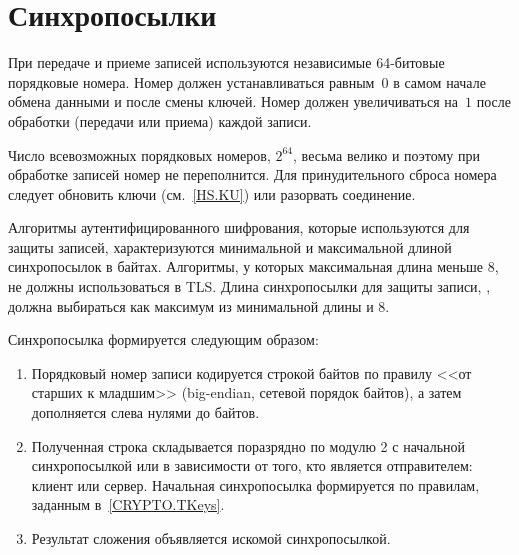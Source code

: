 \section{Синхропосылки}\label{RECORD.Nonce}

При передаче и приеме записей используются независимые 64-битовые порядковые номера.
Номер должен устанавливаться равным~$0$ в самом начале обмена данными и после 
смены ключей. Номер должен увеличиваться на~$1$ после обработки (передачи 
или приема) каждой записи. 

Число всевозможных порядковых номеров, $2^{64}$, весьма велико и поэтому при 
обработке записей номер не переполнится. Для принудительного сброса 
номера следует обновить ключи (см.~\ref{HS.KU}) или разорвать соединение.

Алгоритмы аутентифицированного шифрования, которые используются для защиты 
записей, характеризуются минимальной и максимальной длиной синхропосылок в байтах.
Алгоритмы, у которых максимальная длина меньше 8, не должны использоваться в TLS. 
Длина синхропосылки для защиты записи, , должна выбираться 
как максимум из минимальной длины и $8$.

Синхропосылка формируется следующим образом: 
\begin{enumerate}
\item 
Порядковый номер записи кодируется строкой байтов по правилу <<от старших к
младшим>> (big-endian, сетевой порядок байтов), а затем дополняется слева 
нулями до  байтов.

\item 
Полученная строка складывается поразрядно по модулю 2 с начальной 
синхропосылкой  или  в зависимости 
от того, кто является отправителем: клиент или сервер.
Начальная синхропосылка формируется по правилам, заданным в~\ref{CRYPTO.TKeys}.

\item 
Результат сложения объявляется искомой синхропосылкой.
\end{enumerate}
